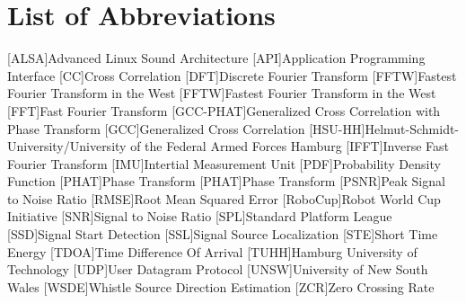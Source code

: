 \chapter*{List of Abbreviations}
\label{sec:abbreviations}

\begin{acronym}\itemsep0pt
  [ALSA]{Advanced Linux Sound Architecture}
  [API]{Application Programming Interface}
  [CC]{Cross Correlation}
  [DFT]{Discrete Fourier Transform}
  [FFTW]{Fastest Fourier Transform in the West}
  [FFTW]{Fastest Fourier Transform in the West}
  [FFT]{Fast Fourier Transform}
  [GCC-PHAT]{Generalized Cross Correlation with Phase Transform}
  [GCC]{Generalized Cross Correlation}
  [HSU-HH]{Helmut-Schmidt-University/University of the Federal Armed Forces Hamburg}
  [IFFT]{Inverse Fast Fourier Transform}
  [IMU]{Intertial Measurement Unit}
  [PDF]{Probability Density Function}
  [PHAT]{Phase Transform}
  [PHAT]{Phase Transform}
  [PSNR]{Peak Signal to Noise Ratio}
  [RMSE]{Root Mean Squared Error}
  [RoboCup]{Robot World Cup Initiative}
  [SNR]{Signal to Noise Ratio}
  [SPL]{Standard Platform League}
  [SSD]{Signal Start Detection}
  [SSL]{Signal Source Localization}
  [STE]{Short Time Energy}
  [TDOA]{Time Difference Of Arrival}
  [TUHH]{Hamburg University of Technology}
  [UDP]{User Datagram Protocol}
  [UNSW]{University of New South Wales}
  [WSDE]{Whistle Source Direction Estimation}
  [ZCR]{Zero Crossing Rate}
\end{acronym}
